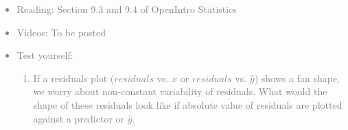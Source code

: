 \documentclass[11pt]{article}
\newcommand{\gray}[1]{\textcolor{gray}{#1}}
\begin{document}
\gray{
{\it
\vspace{-0.55cm}
\begin{itemize}
\renewcommand{\labelitemi}{{\textcolor{dark}{$\ast$}}}
\item Reading: Section 9.3 and 9.4 of OpenIntro Statistics
\item Videos: To be posted
\item Test yourself:
\begin{enumerate}
\item If a residuals plot ($residuals$ vs. $x$ or $residuals$ vs. $\hat{y}$) shows a fan shape, we worry about non-constant variability of residuals. What would the shape of these residuals look like if absolute value of residuals are plotted against a predictor or $\hat{y}$.
\end{enumerate}
\end{itemize}
}}
\end{document}
